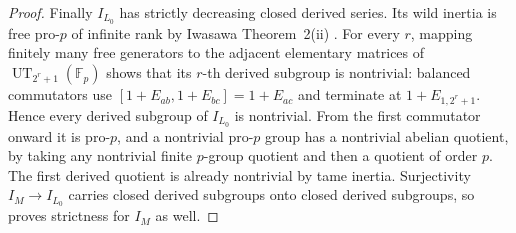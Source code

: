 \begin{proof}
Finally $I_{L_0}$ has strictly decreasing closed
derived series.  Its wild inertia is free pro-$p$
of infinite rank by Iwasawa Theorem~2(ii)
\citep{AN_Iwasawa1955}.
For every $r$, mapping finitely many free generators
to the adjacent elementary matrices of
$\operatorname{UT}_{2^r+1}(\mathbb F_p)$ shows that
its $r$-th derived subgroup is nontrivial:
balanced commutators use
$[1+E_{ab},1+E_{bc}]=1+E_{ac}$ and terminate at
$1+E_{1,2^r+1}$.
Hence every derived subgroup of $I_{L_0}$ is
nontrivial.  From the first commutator onward it
is pro-$p$, and a nontrivial pro-$p$ group has
a nontrivial abelian quotient, by taking any
nontrivial finite $p$-group quotient and then
a quotient of order $p$.
The first derived quotient is already nontrivial
by tame inertia.
Surjectivity $I_M\to I_{L_0}$ carries closed
derived subgroups onto closed derived subgroups,
so proves strictness for $I_M$ as well.
\end{proof}

